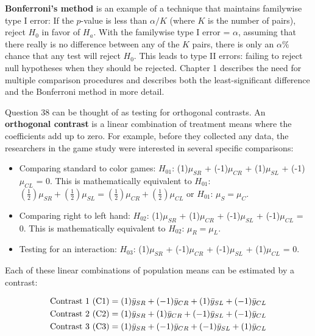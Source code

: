 \documentclass[
]{report}
\providecommand{\tightlist}{%
  \setlength{\itemsep}{0pt}\setlength{\parskip}{0pt}}
\begin{document}
\textbf{Bonferroni's method} is an example of a technique that maintains familywise type I error: If the \(p\)-value is less than \(\alpha/K\) (where \(K\) is the number of pairs), reject \(H_0\) in favor of \(H_a\). With the familywise type I error = \(\alpha\), assuming that there really is no difference between any of the \(K\) pairs, there is only an \(\alpha\%\) chance that any test will reject \(H_0\). This leads to type II errors: failing to reject null hypotheses when they should be rejected. Chapter 1 describes the need for multiple comparison procedures and describes both the least-significant difference and the Bonferroni method in more detail.
\normalsize

Question 38 can be thought of as testing for orthogonal contrasts. An \textbf{orthogonal contrast} is a linear combination of treatment means where the coefficients add up to zero. For example, before they collected any data, the researchers in the game study were interested in several specific comparisons:

\begin{itemize}
\tightlist
\item
  Comparing standard to color games: \(H_{01}\): (1)\(\mu_{SR}\) + (-1)\(\mu_{CR}\) + (1)\(\mu_{SL}\) + (-1)\(\mu_{CL}\) = 0. This is mathematically equivalent to \(H_{01}\): \((\frac{1}{2})\mu_{SR} + (\frac{1}{2})\mu_{SL} = (\frac{1}{2})\mu_{CR} + (\frac{1}{2})\mu_{CL}\) or \(H_{01}\): \(\mu_{S} = \mu_{C}\).
\item
  Comparing right to left hand: \(H_{02}\): (1)\(\mu_{SR}\) + (1)\(\mu_{CR}\) + (-1)\(\mu_{SL}\) + (-1)\(\mu_{CL}\) = 0. This is mathematically equivalent to \(H_{02}\): \(\mu_{R} = \mu_{L}\).
\item
  Testing for an interaction: \(H_{03}\): (1)\(\mu_{SR}\) + (-1)\(\mu_{CR}\) + (-1)\(\mu_{SL}\) + (1)\(\mu_{CL}\) = 0.
\end{itemize}

Each of these linear combinations of population means can be estimated by a contrast:

\begin{align}
\text{Contrast 1 (C1)} &= (1)\bar{y}_{SR} + (-1)\bar{y}_{CR} + (1)\bar{y}_{SL} + (-1)\bar{y}_{CL} \notag \\
\text{Contrast 2 (C2)} &= (1)\bar{y}_{SR} + (1)\bar{y}_{CR} + (-1)\bar{y}_{SL} + (-1)\bar{y}_{CL} \notag \\
\text{Contrast 3 (C3)} &= (1)\bar{y}_{SR} + (-1)\bar{y}_{CR} + (-1)\bar{y}_{SL} + (1)\bar{y}_{CL}
\notag
\end{align}
\end{document}
